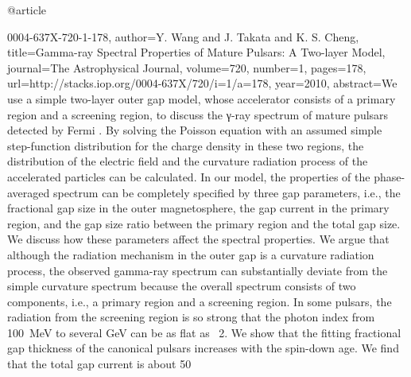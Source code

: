 {@article{0004-637X-720-1-178,
  author={Y. Wang and J. Takata and K. S. Cheng},
  title={Gamma-ray Spectral Properties of Mature Pulsars: A Two-layer Model},
  journal={The Astrophysical Journal},
  volume={720},
  number={1},
  pages={178},
  url={http://stacks.iop.org/0004-637X/720/i=1/a=178},
  year={2010},
  abstract={We use a simple two-layer outer gap model, whose accelerator consists of a primary region and a screening region, to discuss the γ-ray spectrum of mature pulsars detected by Fermi . By solving the Poisson equation with an assumed simple step-function distribution for the charge density in these two regions, the distribution of the electric field and the curvature radiation process of the accelerated particles can be calculated. In our model, the properties of the phase-averaged spectrum can be completely specified by three gap parameters, i.e., the fractional gap size in the outer magnetosphere, the gap current in the primary region, and the gap size ratio between the primary region and the total gap size. We discuss how these parameters affect the spectral properties. We argue that although the radiation mechanism in the outer gap is a curvature radiation process, the observed gamma-ray spectrum can substantially deviate from the simple curvature spectrum because the overall spectrum consists of two components, i.e., a primary region and a screening region. In some pulsars, the radiation from the screening region is so strong that the photon index from 100 MeV to several GeV can be as flat as ~2. We show that the fitting fractional gap thickness of the canonical pulsars increases with the spin-down age. We find that the total gap current is about 50%
}

}}
